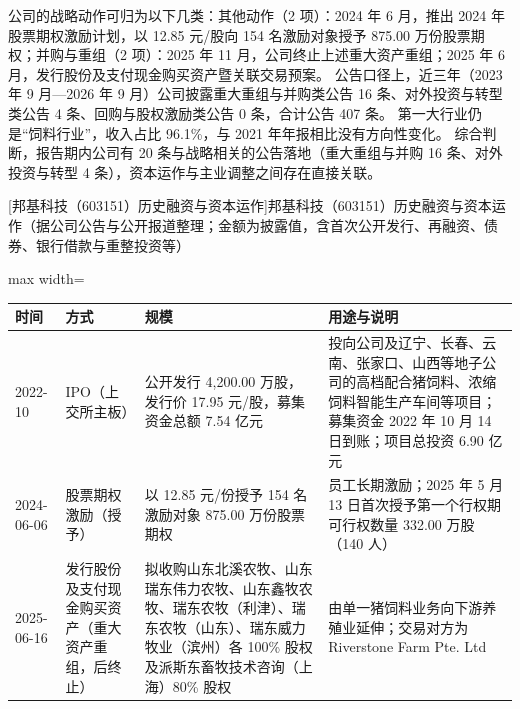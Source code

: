  公司的战略动作可归为以下几类：其他动作（2 项）：2024 年 6 月，推出 2024 年股票期权激励计划，以 12.85 元/股向 154 名激励对象授予 875.00 万份股票期权；并购与重组（2 项）：2025 年 11 月，公司终止上述重大资产重组；2025 年 6 月，发行股份及支付现金购买资产暨关联交易预案。 公告口径上，近三年（2023 年 9 月---2026 年 9 月）公司披露重大重组与并购类公告 16 条、对外投资与转型类公告 4 条、回购与股权激励类公告 0 条，合计公告 407 条。 第一大行业仍是“饲料行业”，收入占比 96.1\%，与 2021 年年报相比没有方向性变化。 综合判断，报告期内公司有 20 条与战略相关的公告落地（重大重组与并购 16 条、对外投资与转型 4 条），资本运作与主业调整之间存在直接关联。

\begin{center}\small\setlength{\tabcolsep}{4pt}
[邦基科技（603151）历史融资与资本运作]{邦基科技（603151）历史融资与资本运作（据公司公告与公开报道整理；金额为披露值，含首次公开发行、再融资、债券、银行借款与重整投资等）}
\begin{adjustbox}{max width=\textwidth}
\begin{tabular}{@{}p{1.45cm}p{2.55cm}p{4.05cm}p{4.95cm}@{}}
\toprule
时间 & 方式 & 规模 & 用途与说明 \\
\midrule
2022-10 & IPO（上交所主板） & 公开发行 4,\allowbreak{}200.00 万股，\allowbreak{}发行价 17.95 元/\allowbreak{}股，\allowbreak{}募集资金总额 7.54 亿元 & 投向公司及辽宁、\allowbreak{}长春、\allowbreak{}云南、\allowbreak{}张家口、\allowbreak{}山西等地子公司的高档配合猪饲料、\allowbreak{}浓缩饲料智能生产车间等项目；募集资金 2022 年 10 月 14 日到账；项目总投资 6.90 亿元 \\
2024-06-06 & 股票期权激励（授予） & 以 12.85 元/\allowbreak{}份授予 154 名激励对象 875.00 万份股票期权 & 员工长期激励；2025 年 5 月 13 日首次授予第一个行权期可行权数量 332.00 万股（140 人） \\
2025-06-16 & 发行股份及支付现金购买资产（重大资产重组，后终止） & 拟收购山东北溪农牧、\allowbreak{}山东瑞东伟力农牧、\allowbreak{}山东鑫牧农牧、\allowbreak{}瑞东农牧（利津）、\allowbreak{}瑞东农牧（山东）、\allowbreak{}瑞东威力牧业（滨州）各 100\% 股权及派斯东畜牧技术咨询（上海）80\% 股权 & 由单一猪饲料业务向下游养殖业延伸；交易对方为 Riverstone Farm Pte. Ltd \\
\bottomrule
\end{tabular}
\end{adjustbox}
\end{center}


